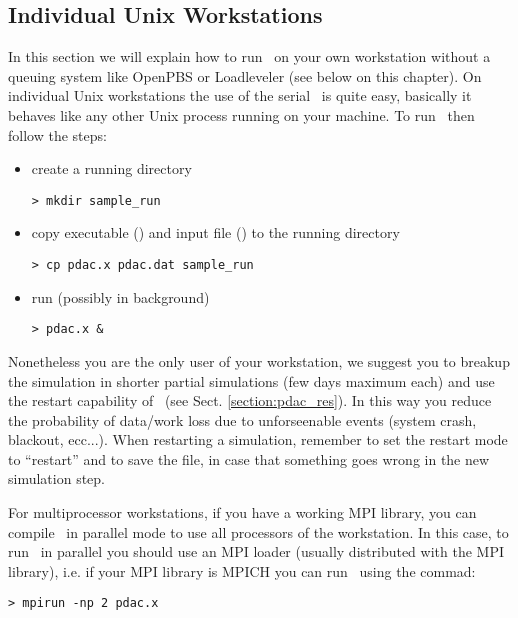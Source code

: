 \subsection{Individual Unix Workstations}

In this section we will explain how to run \PDAC\ on your own
workstation without a queuing system like
OpenPBS or Loadleveler (see below on this chapter).
On individual Unix workstations the use of the serial \PDAC\ is
quite easy, basically it behaves like any other Unix process
running on your machine.
To run \PDAC\ then follow the steps:

\begin{itemize}

\item create a running directory\
\begin{verbatim}
> mkdir sample_run
\end{verbatim}

\item copy executable () and input file ()
      to the running directory\
\begin{verbatim}
> cp pdac.x pdac.dat sample_run
\end{verbatim}

\item run  (possibly in background)
\begin{verbatim}
> pdac.x &
\end{verbatim}

\end{itemize}

Nonetheless you are the only user of your workstation,
we suggest you to breakup the simulation in shorter partial
simulations (few days maximum each) and use the
restart capability of \PDAC\ (see Sect. \ref{section:pdac_res}). 
In this way you reduce the probability of data/work loss due to 
unforseenable events (system crash, blackout, ecc...).
When restarting a simulation, remember to set the 
restart mode to ``restart'' and to save the  file,
in case that something goes wrong in the new simulation step.

For multiprocessor workstations, if you have a working MPI
library, you can compile \PDAC\ in parallel mode to use
all processors of the workstation. In this case,
to run \PDAC\ in parallel you should use an MPI loader 
(usually distributed with the MPI library), i.e. if
your MPI library is MPICH you can run \PDAC\ using the commad:

\begin{verbatim}
> mpirun -np 2 pdac.x
\end{verbatim}

